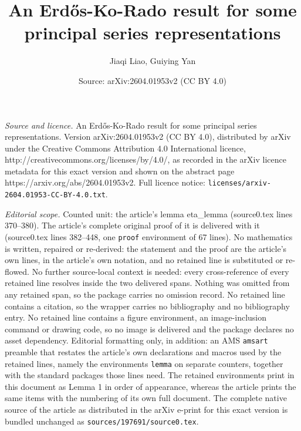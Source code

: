 \documentclass[10pt,a4paper]{amsart}
\title{A\lowercase{n} E\lowercase{rd\H{o}s}-K\lowercase{o}-R\lowercase{ado result for some principal series representations}}
\author{Jiaqi Liao, Guiying Yan}
\date{Source: arXiv:2604.01953v2 (CC BY 4.0)}
\begin{document}
\maketitle

\noindent\emph{Source and licence.} A\lowercase{n} E\lowercase{rd\H{o}s}-K\lowercase{o}-R\lowercase{ado result for some principal series representations}. Version arXiv:2604.01953v2 (CC BY 4.0), distributed by arXiv under the Creative Commons Attribution 4.0 International licence, http://creativecommons.org/licenses/by/4.0/, as recorded in the arXiv licence metadata for this exact version and shown on the abstract page https://arxiv.org/abs/2604.01953v2. Full licence notice: \texttt{licenses/arxiv-2604.01953-CC-BY-4.0.txt}.\par\smallskip

\noindent\textit{Editorial scope.} Counted unit: the article's lemma eta\_lemma (source0.tex lines 370--380). The article's complete original proof of it is delivered with it (source0.tex lines 382--448, one \texttt{proof} environment of 67 lines). No mathematics is written, repaired or re-derived: the statement and the proof are the article's own lines, in the article's own notation, and no retained line is substituted or re-flowed.  No further source-local context is needed: every cross-reference of every retained line resolves inside the two delivered spans.  Nothing was omitted from any retained span, so the package carries no omission record.  No retained line contains a citation, so the wrapper carries no bibliography and no bibliography entry.  No retained line contains a figure environment, an image-inclusion command or drawing code, so no image is delivered and the package declares no asset dependency.  Editorial formatting only, in addition: an AMS \texttt{amsart} preamble that restates the article's own declarations and macros used by the retained lines, namely the environments \texttt{lemma} on separate counters, together with the standard packages those lines need.  The retained environments print in this document as Lemma 1 in order of appearance, whereas the article prints the same items with the numbering of its own full document.  The complete native source of the article as distributed in the arXiv e-print for this exact version is bundled unchanged as \texttt{sources/197691/source0.tex}.
\end{document}
